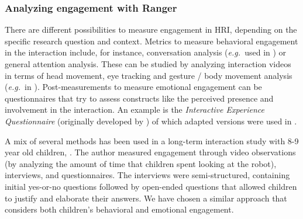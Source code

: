 \documentclass{sig-alternate}
\newcommand{\eg}{{\textit{e.g.~}}}
\begin{document}
\subsubsection{Analyzing engagement with Ranger}

	

There are different possibilities to measure engagement in HRI, depending on the
specific research question and context. Metrics to measure behavioral engagement
in the interaction include, for instance, conversation analysis (\eg used in
\cite{short_no_2010}) or general attention analysis. These can be studied by
analyzing interaction videos in terms of head movement, eye tracking and gesture
/ body movement analysis (\eg in \cite{sidner_explorations_2005}).
Post-measurements to measure emotional engagement can be questionnaires that try
to assess constructs like the perceived presence and involvement in the
interaction. An example is the \textit{Interactive Experience Questionnaire}
(originally developed by \cite{lombard_measuring_2000}) of which adapted
versions were used in
\cite{kidd_effect_2004,bainbridge_effect_2008,short_no_2010}.

A mix of several methods has been used in a long-term interaction study with 8-9
year old children, \cite{leite_long-term_2013}. The author measured engagement
through video observations (by analyzing the amount of time that children spent
looking at the robot), interviews, and questionnaires. The interviews were
semi-structured, containing initial yes-or-no questions followed by open-ended
questions that allowed children to justify and elaborate their answers. We have
chosen a similar approach that considers both children's behavioral and
emotional engagement.	
\end{document}
